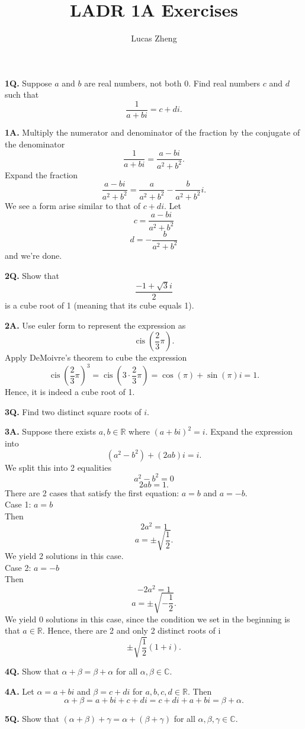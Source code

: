 \documentclass[12pt, letterpaper]{article}
\title{LADR 1A Exercises}
\author{Lucas Zheng}
\date{}
\DeclareMathOperator\cis{cis}
\begin{document}
\maketitle

\textbf{1Q.} 
Suppose $a$ and $b$ are real numbers, not both 0. Find real numbers $c$ and
$d$ such that
$${\frac{1}{a+bi}}=c+di.$$

\textbf{1A.} 
Multiply the numerator and denominator of the fraction by the conjugate of the denominator
$$\frac{1}{a+bi} = \frac{a-bi}{a^2+b^2}.$$
Expand the fraction
$$\frac{a-bi}{a^2+b^2} = \frac{a}{a^2+b^2} - \frac{b}{a^2+b^2}i.$$
We see a form arise similar to that of ${c+di}$. Let
$$c = \frac{a-bi}{a^2+b^2}$$
$$d = -\frac{b}{a^2+b^2}$$
and we're done.

\textbf{2Q.} 
Show that
$$\frac{-1+\sqrt{3}i}{2}$$
is a cube root of 1 (meaning that its cube equals 1).

\textbf{2A.} 
Use euler form to represent the expression as
$$\cis(\frac{2}{3}\pi).$$
Apply DeMoivre's theorem to cube the expression
$$\cis(\frac{2}{3}\pi)^3 = \cis(3\cdot\frac{2}{3}\pi) = \cos(\pi) + \sin(\pi)i = 1.$$
Hence, it is indeed a cube root of 1.

\textbf{3Q.} 
Find two distinct square roots of $i$.

\textbf{3A.} 
Suppose there exists $a,b\in\mathbb{R}$ where $(a+bi)^2 = i$. Expand the expression into
$$(a^2-b^2)+(2ab)i = i.$$
We split this into 2 equalities
$$a^2-b^2=0$$
$$2ab = 1.$$
There are 2 cases that satisfy the first equation: $a = b$ and $a = -b$.
\\Case 1: $a=b$
\\Then
$$2a^2 = 1$$
$$a = \pm\sqrt{\frac{1}{2}}.$$
We yield 2 solutions in this case.
\\Case 2: $a=-b$
\\Then
$$-2a^2 = 1$$
$$a = \pm\sqrt{-\frac{1}{2}}.$$
We yield 0 solutions in this case, since the condition we set in the beginning is that $a\in\mathbb{R}$.
Hence, there are 2 and only 2 distinct roots of i
$$\pm\sqrt{\frac{1}{2}}(1+i).$$

\textbf{4Q.}
Show that $\alpha + \beta = \beta + \alpha$ for all $\alpha,\beta\in\mathbb{C}$.

\textbf{4A.}
Let $\alpha = a + bi$ and $\beta = c + di$ for $a,b,c,d\in\mathbb{R}$. Then
$$\alpha + \beta = a + bi + c + di = c + di + a + bi = \beta + \alpha.$$

\textbf{5Q.} Show that $(\alpha+\beta)+\gamma=\alpha+(\beta+\gamma)$ for all $\alpha,\beta,\gamma\in\mathbb{C}$.
\end{document}
